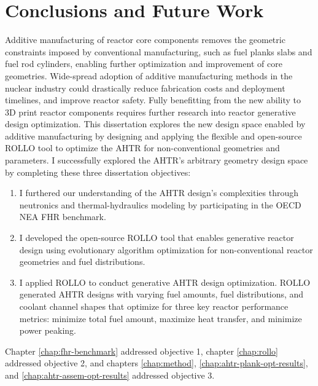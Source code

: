 \chapter{Conclusions and Future Work}
\glsresetall
\label{chap:concl}

Additive manufacturing of reactor core components removes the geometric constraints
imposed by conventional manufacturing, such as fuel planks slabs and fuel rod 
cylinders, enabling further optimization and improvement of core geometries. 
Wide-spread adoption of additive manufacturing methods in the nuclear industry
could drastically reduce fabrication costs and deployment timelines, and improve 
reactor safety. 
Fully benefitting from the new ability to 3D print reactor components requires further 
research into reactor generative design optimization. 
This dissertation explores the new design space enabled by additive manufacturing 
by designing and applying the flexible and open-source \gls{ROLLO} tool to optimize 
the \gls{AHTR} for non-conventional geometries and parameters. 
I successfully explored the \gls{AHTR}'s arbitrary geometry design space by completing 
these three dissertation objectives: 
\begin{enumerate}
    \item I furthered our understanding of the \gls{AHTR} design's complexities 
    through neutronics and thermal-hydraulics modeling by participating in the 
    \gls{OECD} \gls{NEA} \gls{FHR} benchmark.
    \item I developed the open-source \gls{ROLLO} tool that enables generative reactor 
    design using evolutionary algorithm optimization for non-conventional reactor 
    geometries and fuel distributions.
    \item I applied \gls{ROLLO} to conduct generative \gls{AHTR} design optimization.
    \gls{ROLLO} generated \gls{AHTR} designs with varying fuel amounts, fuel 
    distributions, and coolant channel shapes that optimize for three key reactor 
    performance metrics: minimize total fuel amount, maximize heat transfer, and 
    minimize power peaking.
\end{enumerate}
Chapter \ref{chap:fhr-benchmark} addressed objective 1, chapter \ref{chap:rollo} 
addressed objective 2, and chapters \ref{chap:method}, \ref{chap:ahtr-plank-opt-results}, 
and \ref{chap:ahtr-assem-opt-results} addressed objective 3. 

